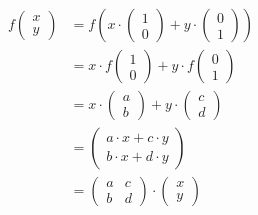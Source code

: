 \begin{align*}
    f \begin{pmatrix} x \\ y \end{pmatrix}     &= f \left( x \cdot \begin{pmatrix} 1 \\ 0 \end{pmatrix} + y \cdot \begin{pmatrix} 0 \\ 1 \end{pmatrix} \right) \\
    &= x \cdot f \begin{pmatrix} 1 \\ 0 \end{pmatrix} + y \cdot f \begin{pmatrix} 0 \\ 1 \end{pmatrix} \\
    &= x \cdot \begin{pmatrix} a \\ b \end{pmatrix} + y \cdot \begin{pmatrix} c \\ d \end{pmatrix} \\
    &= \begin{pmatrix} a \cdot x + c \cdot y \\ b \cdot x + d \cdot y \end{pmatrix} \\
    &= \begin{pmatrix} a & c\\ b & d \end{pmatrix} \cdot \begin{pmatrix} x \\ y \end{pmatrix}
\end{align*}



